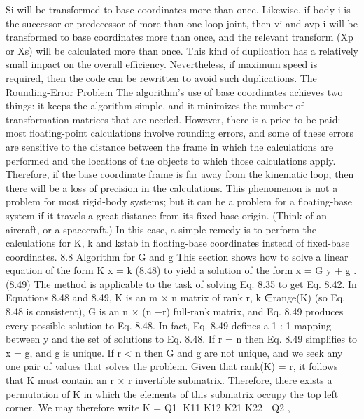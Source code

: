 Si will be transformed to base coordinates more than once. Likewise, if body i is the successor or predecessor of more than one loop joint, then vi and avp i will be transformed to base coordinates more than once, and the relevant transform (Xp or Xs) will be calculated more than once. This kind of duplication has a relatively small impact on the overall efficiency. Nevertheless, if maximum speed is required, then the code can be rewritten to avoid such duplications. The Rounding-Error Problem The algorithm’s use of base coordinates achieves two things: it keeps the algorithm simple, and it minimizes the number of transformation matrices that are needed. However, there is a price to be paid: most floating-point calculations involve rounding errors, and some of these errors are sensitive to the distance between the frame in which the calculations are performed and the locations of the objects to which those calculations apply. Therefore, if the base coordinate frame is far away from the kinematic loop, then there will be a loss of precision in the calculations. This phenomenon is not a problem for most rigid-body systems; but it can be a problem for a floating-base system if it travels a great distance from its fixed-base origin. (Think of an aircraft, or a spacecraft.) In this case, a simple remedy is to perform the calculations for K, k and kstab in floating-base coordinates instead of fixed-base coordinates. 8.8 Algorithm for G and g This section shows how to solve a linear equation of the form K x = k (8.48) to yield a solution of the form x = G y + g . (8.49) The method is applicable to the task of solving Eq. 8.35 to get Eq. 8.42. In Equations 8.48 and 8.49, K is an m × n matrix of rank r, k ∈range(K) (so Eq. 8.48 is consistent), G is an n × (n −r) full-rank matrix, and Eq. 8.49 produces every possible solution to Eq. 8.48. In fact, Eq. 8.49 defines a 1 : 1 mapping between y and the set of solutions to Eq. 8.48. If r = n then Eq. 8.49 simplifies to x = g, and g is unique. If r < n then G and g are not unique, and we seek any one pair of values that solves the problem. Given that rank(K) = r, it follows that K must contain an r × r invertible submatrix. Therefore, there exists a permutation of K in which the elements of this submatrix occupy the top left corner. We may therefore write K = Q1 K11 K12 K21 K22  Q2 ,

